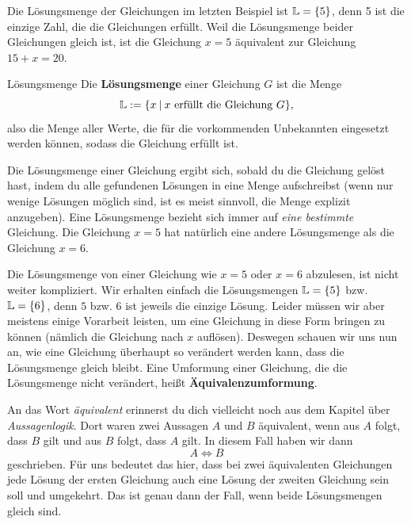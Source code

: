 \documentclass[../../main.tex]{subfiles}
\begin{document}
\begin{example}{}
    Die Lösungsmenge der Gleichungen im letzten Beispiel ist $\mathbb{L}=\{5\}$, denn 5 ist die einzige Zahl, die die Gleichungen erfüllt. Weil die Lösungsmenge beider Gleichungen gleich ist, ist die Gleichung $x=5$ äquivalent zur Gleichung $15+x=20$.
\end{example}

\begin{definition}{Lösungsmenge}
    Die \textbf{Lösungsmenge} einer Gleichung $G$ ist die Menge 
    \[\mathbb{L}:=\{x\:|\:x~\text{erfüllt die Gleichung~}G\},\]
    also die Menge aller Werte, die für die vorkommenden Unbekannten eingesetzt werden können, sodass die Gleichung erfüllt ist.
\end{definition}

Die Lösungsmenge einer Gleichung ergibt sich, sobald du die Gleichung gelöst hast, indem du alle gefundenen Lösungen in eine Menge aufschreibst (wenn nur wenige Lösungen möglich sind, ist es meist sinnvoll, die Menge explizit anzugeben). Eine Lösungsmenge bezieht sich immer auf \emph{eine bestimmte} Gleichung. Die Gleichung $x=5$ hat natürlich eine andere Lösungsmenge als die Gleichung $x=6$.

Die Lösungsmenge von einer Gleichung wie $x=5$ oder $x=6$ abzulesen, ist nicht weiter kompliziert. Wir erhalten einfach die Lösungsmengen $\mathbb{L}=\{5\}$ bzw. $\mathbb{L}=\{6\}$, denn $5$ bzw. $6$ ist jeweils die einzige Lösung. Leider müssen wir aber meistens einige Vorarbeit leisten, um eine Gleichung in diese Form bringen zu können (nämlich die Gleichung nach $x$ auflösen). Deswegen schauen wir uns nun an, wie eine Gleichung überhaupt so verändert werden kann, dass die Lösungsmenge gleich bleibt. Eine Umformung einer Gleichung, die die Lösungsmenge nicht verändert, heißt \textbf{Äquivalenzumformung}.

An das Wort \emph{äquivalent} erinnerst du dich vielleicht noch aus dem Kapitel über \emph{Aussagenlogik}. Dort waren zwei Aussagen $A$ und $B$ äquivalent, wenn aus $A$ folgt, dass $B$ gilt und aus $B$ folgt, dass $A$ gilt. In diesem Fall haben wir dann
\[A\iff B\]
geschrieben. Für uns bedeutet das hier, dass bei zwei äquivalenten Gleichungen jede Lösung der ersten Gleichung auch eine Lösung der zweiten Gleichung sein soll und umgekehrt. Das ist genau dann der Fall, wenn beide Lösungsmengen gleich sind.
\end{document}
